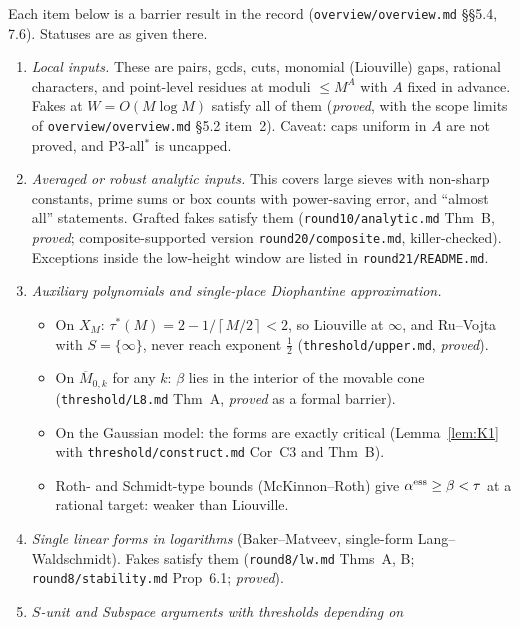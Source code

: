 \documentclass[11pt]{article}
\newcommand{\ceil}[1]{\left\lceil #1 \right\rceil}
\newcommand{\rec}[1]{\texttt{#1}}
\begin{document}
Each item below is a barrier result in the record
(\rec{overview/overview.md} \S\S5.4, 7.6).  Statuses are as given there.
\begin{enumerate}[leftmargin=2em]
  \item \emph{Local inputs.}  These are pairs, gcds, cuts, monomial
    (Liouville) gaps, rational characters, and point-level residues at moduli
    \(\le M^A\) with \(A\) fixed in advance.  Fakes at \(W=O(M\log M)\) satisfy
    all of them (\emph{proved}, with the scope limits of
    \rec{overview/overview.md} \S5.2 item~2).  Caveat: caps uniform in \(A\)
    are not proved, and P3-all\(^*\) is uncapped.
  \item \emph{Averaged or robust analytic inputs.}  This covers large sieves
    with non-sharp constants, prime sums or box counts with power-saving
    error, and ``almost all'' statements.  Grafted fakes satisfy them
    (\rec{round10/analytic.md} Thm~B, \emph{proved}; composite-supported
    version \rec{round20/composite.md}, killer-checked).  Exceptions inside the
    low-height window are listed in \rec{round21/README.md}.
  \item \emph{Auxiliary polynomials and single-place Diophantine
    approximation.}
    \begin{itemize}
      \item On \(X_M\): \(\tau^*(M)=2-1/\ceil{M/2}<2\), so Liouville at
        \(\infty\), and Ru--Vojta with \(S=\{\infty\}\), never reach exponent
        \(\frac12\) (\rec{threshold/upper.md}, \emph{proved}).
      \item On \(\overline M_{0,k}\) for any \(k\): \(\beta\) lies in the
        interior of the movable cone (\rec{threshold/L8.md} Thm~A,
        \emph{proved} as a formal barrier).
      \item On the Gaussian model: the forms are exactly critical
        (Lemma~\ref{lem:K1} with \rec{threshold/construct.md} Cor~C3 and
        Thm~B).
      \item Roth- and Schmidt-type bounds (McKinnon--Roth) give
        \(\alpha^{\rm ess}\ge\beta<\tau\) at a rational target: weaker than
        Liouville.
    \end{itemize}
  \item \emph{Single linear forms in logarithms} (Baker--Matveev, single-form
    Lang--Waldschmidt).  Fakes satisfy them (\rec{round8/lw.md} Thms~A, B;
    \rec{round8/stability.md} Prop~6.1; \emph{proved}).
  \item \emph{\(S\)-unit and Subspace arguments with thresholds depending on
}
\end{enumerate}
\end{document}
